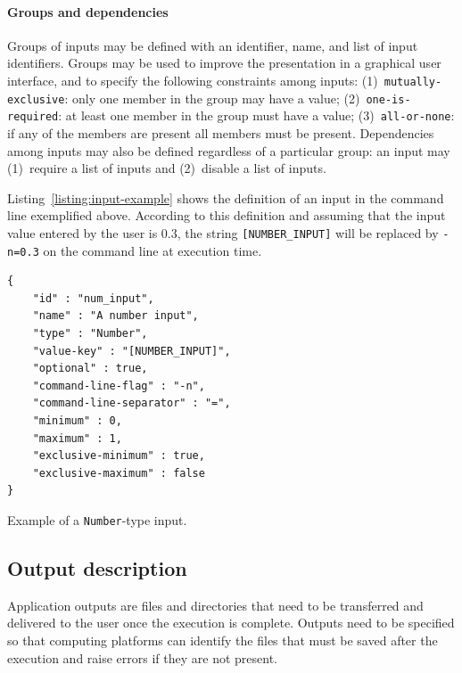 \documentclass[a4paper,num-refs]{oup-contemporary}
\begin{document}
\paragraph{Groups and dependencies} Groups of inputs may be defined
with an identifier, name, and list of input identifiers. Groups may be
used to improve the presentation in a graphical user interface, and to
specify the following constraints among inputs:
(1)~\texttt{mutually-exclusive}: only one member in the group may have
a value; (2)~\texttt{one-is-required}: at least one member in the
group must have a value; (3)~\texttt{all-or-none}: if any of the
members are present all members must be present. Dependencies among
inputs may also be defined regardless of a particular group: an input
may (1)~require a list of inputs and (2)~disable a list of inputs.

Listing~\ref{listing:input-example} shows the definition of an input in the
command line exemplified above. According to this definition and assuming
that the input value entered by the user is 0.3, the string
\texttt{[NUMBER\_INPUT]} will be replaced by \texttt{-n=0.3} on the command
line at execution time.
\begin{listing}
\begin{verbatim}
{
    "id" : "num_input",
    "name" : "A number input",
    "type" : "Number",
    "value-key" : "[NUMBER_INPUT]",
    "optional" : true,
    "command-line-flag" : "-n",
    "command-line-separator" : "=",
    "minimum" : 0,
    "maximum" : 1,
    "exclusive-minimum" : true,
    "exclusive-maximum" : false
}
\end{verbatim}
\caption{Example of a \texttt{Number}-type input.} 
\label{listing:input-example}
\end{listing}

\subsection{Output description}

Application outputs are files and directories that need to be
transferred and delivered to the user once the execution is
complete. Outputs need to be specified so that computing platforms can
identify the files that must be saved after the execution and raise
errors if they are not present.
\end{document}
